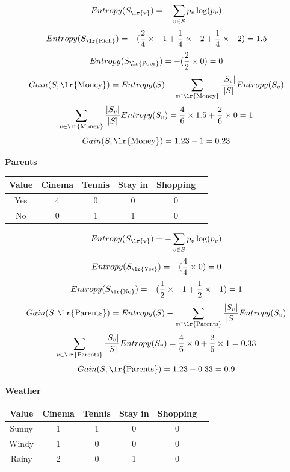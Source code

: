 \documentclass{article}
\newcommand{\tf}[1]{\text{\lr{#1}}}
\begin{document}
	\vspace{5pt}
	\[
	Entropy(S_{\text{\lr{v}}}) = -\sum_{v \in S} p_v\log (p_v)
	\]
	\[
	Entropy(S_{\tf{Rich}}) = -(\frac{2}{4} \times -1 + \frac{1}{4} \times -2 + \frac{1}{4} \times -2) = 1.5
	\]
	\[
	Entropy(S_{\tf{Poor}}) = -(\frac{2}{2} \times 0) = 0
	\]
	\vspace{10pt}
	\[
	Gain(S, \tf{Money}) = Entropy(S) - \sum_{v \in \tf{Money}} \frac{| S_v |}{| S |}Entropy(S_v)
	\] 
	\[
	\sum_{v \in \tf{Money}} \frac{| S_v |}{| S |}Entropy(S_v) = \frac{4}{6} \times 1.5 + \frac{2}{6} \times 0 = 1
	\]
	\[
	Gain(S, \tf{Money}) = 1.23 - 1 = 0.23
	\]
	\begin{latin}
		\textbf{Parents}
		\begin{center}
			\begin{tabular}{|c|c|c|c|c|c|}
				\hline
				Value & Cinema & Tennis & Stay in & Shopping\\
				\hline
				\hline
				Yes & 4 & 0 & 0 & 0\\
				\hline
				No &0& 1 & 1 & 0\\
				\hline
			\end{tabular}
		\end{center}
	\end{latin}
	\vspace{5pt}
	\[
	Entropy(S_{\tf{v}}) = -\sum_{v \in S} p_v\log (p_v)
	\]
	\[
	Entropy(S_{\tf{Yes}}) = -(\frac{4}{4} \times 0) = 0
	\]
	\[
	Entropy(S_{\tf{No}}) = -(\frac{1}{2} \times -1 + \frac{1}{2} \times -1) = 1
	\]
	\vspace{10pt}
	\[
	Gain(S, \tf{Parents}) = Entropy(S) - \sum_{v \in \tf{Parents}} \frac{| S_v |}{| S |}Entropy(S_v)
	\] 
	\[
	\sum_{v \in \tf{Parents}} \frac{| S_v |}{| S |}Entropy(S_v) = \frac{4}{6} \times 0 + \frac{2}{6} \times 1 = 0.33
	\]
	\[
	Gain(S, \tf{Parents}) = 1.23 - 0.33 = 0.9
	\]
	\begin{latin}
		\textbf{Weather}
		\begin{center}
			\begin{tabular}{|c|c|c|c|c|c|}
				\hline
				Value & Cinema & Tennis & Stay in & Shopping\\
				\hline
				\hline
				Sunny & ‌1& 1 & 0 & 0\\
				\hline
				Windy & 1 & 0 & 0 & 0\\
				\hline
				Rainy & 2 & 0 & 1 & 0\\
				\hline
			\end{tabular}
		\end{center}
	\end{latin}
	\vspace{5pt}
\end{document}
